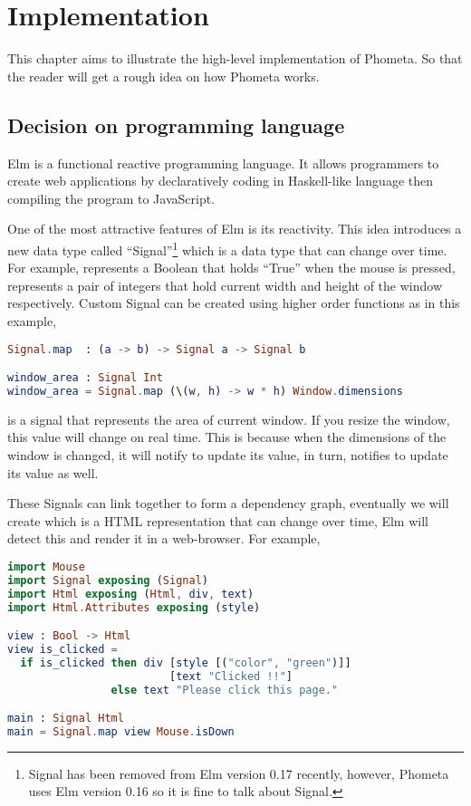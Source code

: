\documentclass[master.tex]{subfiles}
\begin{document}
\chapter{Implementation}
\label{chap:implementation}

This chapter aims to illustrate the high-level implementation of Phometa. So
that the reader will get a rough idea on how Phometa works.

\section{Decision on programming language}
Elm\supercite{elm-official-website} is a functional reactive programming
language. It allows programmers to create web applications by declaratively
coding in Haskell-like language then compiling the program to JavaScript.

One of the most attractive features of Elm is its reactivity. This idea
introduces a new data type called ``Signal''\footnote{Signal has been removed
  from Elm version 0.17 recently, however, Phometa uses Elm version 0.16 so it
  is fine to talk about Signal.} which is a data type that can change over time.
For example,  represents a Boolean that holds
``True'' when the mouse is pressed,  represents a pair of integers that hold current width and height of the
window respectively. Custom Signal can be created using higher order functions
as in this example,
\begin{lstlisting}[language=elm]
Signal.map  : (a -> b) -> Signal a -> Signal b

window_area : Signal Int
window_area = Signal.map (\(w, h) -> w * h) Window.dimensions
\end{lstlisting}
 is a signal that represents the area of current window. If
you resize the window, this value will change on real time. This is because when
the dimensions of the window is changed, it will notify
 to update its value,  in
turn, notifies  to update its value as well.

These Signals can link together to form a dependency graph, eventually we will
create  which is a HTML representation that can change
over time, Elm will detect this  and render it in a web-browser. For
example,

\begin{lstlisting}[language=elm]
import Mouse
import Signal exposing (Signal)
import Html exposing (Html, div, text)
import Html.Attributes exposing (style)

view : Bool -> Html
view is_clicked =
  if is_clicked then div [style [("color", "green")]]
                         [text "Clicked !!"]
                else text "Please click this page."

main : Signal Html
main = Signal.map view Mouse.isDown
\end{lstlisting}
\end{document}
